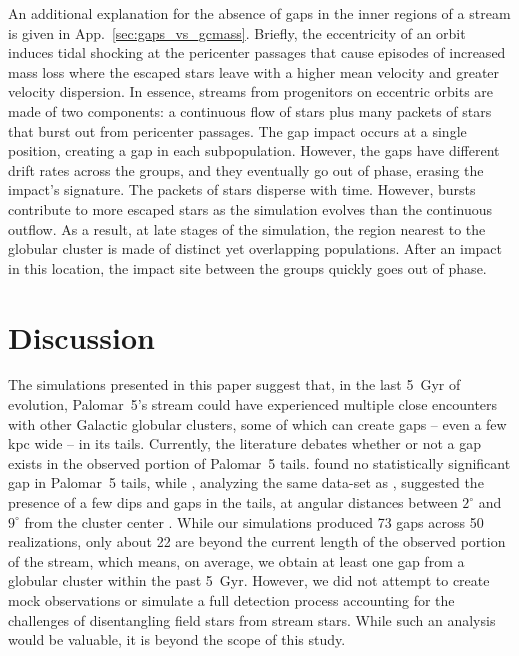 \documentclass{aa}
\begin{document}
    An additional explanation for the absence of gaps in the inner regions of a stream is given in App.~\ref{sec:gaps_vs_gcmass}. Briefly, the eccentricity of an orbit induces tidal shocking at the pericenter passages that cause episodes of increased mass loss where the escaped stars leave with a higher mean velocity and greater velocity dispersion. In essence, streams from progenitors on eccentric orbits are made of two components: a continuous flow of stars plus many packets of stars that burst out from pericenter passages. The gap impact occurs at a single position, creating a gap in each subpopulation. However, the gaps have different drift rates across the groups, and they eventually go out of phase, erasing the impact's signature. The packets of stars disperse with time. However, bursts contribute to more escaped stars as the simulation evolves than the continuous outflow. As a result, at late stages of the simulation, the region nearest to the globular cluster is made of distinct yet overlapping populations. After an impact in this location, the impact site between the groups quickly goes out of phase. 

  
  
\section{Discussion}\label{sec:discussion}
  
  The simulations presented in this paper suggest that, in the last 5~Gyr of evolution, Palomar~5's stream could have experienced multiple close encounters with other Galactic globular clusters, some of which can create gaps -- even a few kpc wide -- in its tails. Currently, the literature debates whether or not a gap exists in the observed portion of Palomar~5 tails. \citet{2016ApJ...819....1I} found no statistically significant gap in Palomar~5 tails, while \citet{2017MNRAS.470...60E}, analyzing the same data-set as \citet{2016ApJ...819....1I}, suggested the presence of a few dips and gaps in the tails, at angular distances between $2^\circ$ and $9^\circ$ from the cluster center \citep[see also][]{ 2020ApJ...889...70B}. While our simulations produced 73 gaps across 50 realizations, only about 22 are beyond the current length of the observed portion of the stream, which means, on average, we obtain at least one gap from a globular cluster within the past 5~Gyr. However, we did not attempt to create mock observations or simulate a full detection process accounting for the challenges of disentangling field stars from stream stars. While such an analysis would be valuable, it is beyond the scope of this study.
\end{document}
